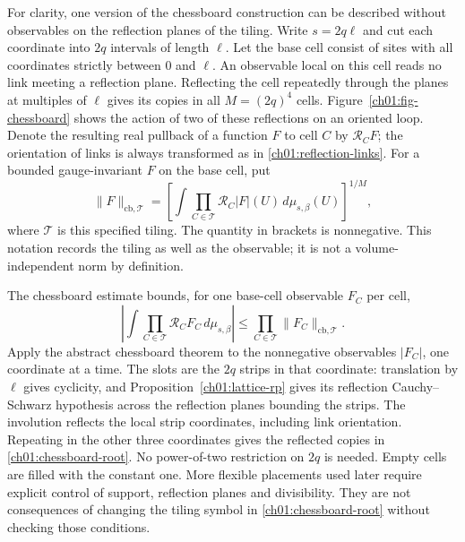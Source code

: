For clarity, one version of the chessboard construction can be described
without observables on the reflection planes of the tiling. Write $s=2q\ell$ and cut each coordinate into
$2q$ intervals of length $\ell$. Let the base cell consist of sites with
all coordinates strictly between $0$ and $\ell$. An observable local on
this cell reads no link meeting a reflection plane. Reflecting the cell repeatedly through the
planes at multiples of $\ell$ gives its copies in all
$M=(2q)^4$ cells. Figure~\ref{ch01:fig-chessboard} shows the action of
two of these reflections on an oriented loop. Denote the resulting real pullback of a function $F$ to
cell $C$ by $\mathcal R_CF$; the orientation of links is always transformed
as in \eqref{ch01:reflection-links}. For a bounded gauge-invariant $F$ on
the base cell, put
\begin{equation}
 \|F\|_{\mathrm{cb},\mathscr T}
 =\left[\int\prod_{C\in\mathscr T}\mathcal R_C|F|(U)
                 \,d\mu_{s,\beta}(U)\right]^{1/M},
 \label{ch01:chessboard-root}
\end{equation}
where $\mathscr T$ is this specified tiling. The quantity in brackets is
nonnegative. This notation records the tiling as well as the observable;
it is not a volume-independent norm by definition.



The chessboard estimate bounds, for one base-cell observable $F_C$ per cell,
\begin{equation}
 \left|\int\prod_{C\in\mathscr T}\mathcal R_CF_C\,d\mu_{s,\beta}\right|
 \le\prod_{C\in\mathscr T}\|F_C\|_{\mathrm{cb},\mathscr T}.
 \label{ch01:chessboard}
\end{equation}
Apply the abstract chessboard theorem
\cite[Theorem~4.1]{FrohlichIsraelLiebSimon1978} to the nonnegative
observables $|F_C|$, one coordinate at a time. The slots are the $2q$
strips in that coordinate: translation by $\ell$ gives cyclicity, and
Proposition~\ref{ch01:lattice-rp} gives its reflection Cauchy--Schwarz
hypothesis across the reflection planes bounding the strips. The involution reflects the local
strip coordinates, including link orientation. Repeating in the other
three coordinates gives the reflected copies in
\eqref{ch01:chessboard-root}. No power-of-two restriction on $2q$ is
needed. Empty cells are filled with the constant one.
More flexible placements used later require explicit control of support,
reflection planes and divisibility. They are not consequences of changing the tiling
symbol in \eqref{ch01:chessboard-root} without checking those conditions.

